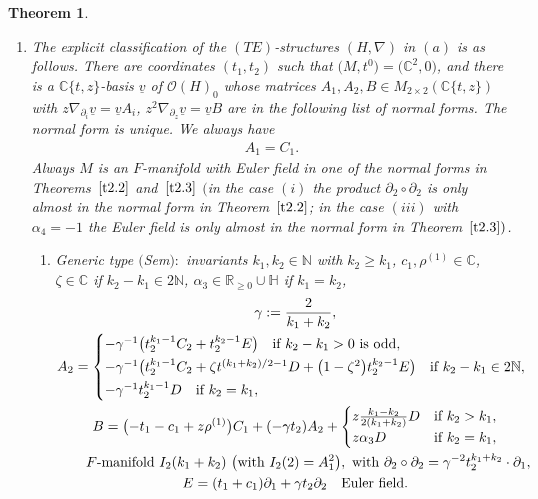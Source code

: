 \documentclass[10pt,a4paper]{amsart}
\numberwithin{equation}{section}
\numberwithin{figure}{section}
\newcommand{\N}{{\mathbb N}}
\newcommand{\C}{{\mathbb C}}
\newcommand{\R}{{\mathbb R}}
\renewcommand{\H}{{\mathbb H}}
\newcommand{\OO}{{\mathcal O}}
\newcommand{\uuuu}{\underline}
\newcommand{\paa}{\partial}
\newcommand{\nnn}{\nabla}
\newtheorem{Theorem}{Theorem}[section]
\begin{document}
\begin{Theorem}
\begin{enumerate}
\item[$(d)$] The explicit classification of the $(TE)$-structures
$(H,\nnn)$ in $(a)$ is as follows.
There are coordinates $(t_1,t_2)$ such that $\big(M,t^0\big)=\big(\C^2,0\big)$,
and there is a $\C\{t,z\}$-basis $\uuuu{v}$ of $\OO(H)_0$
whose matrices $A_1,A_2,B\in M_{2\times 2}(\C\{t,z\})$ with
$z\nnn_{\paa_i}\uuuu{v}=\uuuu{v}A_i$,
$z^2\nnn_{\paa_z}\uuuu{v}=\uuuu{v}B$ are in the following
list of normal forms. The normal form is unique.
We always have
\begin{gather*}%
A_1=C_1.
\end{gather*}
Always $M$ is an $F$-manifold with Euler field
in one of the normal forms in Theorems~$\ref{t2.2}$
and~$\ref{t2.3}$ $($in the case $(i)$ the product
$\paa_2\circ\paa_2$ is only almost in the normal form
in Theorem~$\ref{t2.2}$;
in the case $(iii)$ with $\alpha_4=-1$
the Euler field is only almost in the normal form
in Theorem~$\ref{t2.3})$.


\begin{enumerate}\itemsep=0pt
\item[$(i)$] Generic type $($Sem$){:}$
invariants $k_1,k_2\in\N$ with $k_2\geq k_1$,
$c_1,\rho^{(1)}\in\C$, $\zeta\in\C$ if $k_2-k_1\in 2\N$,
$\alpha_3\in\R_{\geq 0}\cup\H$ if $k_1=k_2$,
\begin{gather*}%
\gamma := \frac{2}{k_1+k_2},
\\
A_2=\begin{cases} -\gamma^{-1}
\big(t_2^{k_1-1}C_2 + t_2^{k_2-1}E\big)
\quad\text{if}\ k_2-k_1>0\ \text{is odd,}
\\[.5ex]
-\gamma^{-1}\big(t_2^{k_1-1}C_2 +\zeta t^{(k_1+k_2)/2-1}D+\big(1-\zeta^2\big)t_2^{k_2-1}E\big)
\quad \text{if}\ k_2-k_1\in 2\N,\!\!\!
\\[.5ex]
-\gamma^{-1}t_2^{k_1-1}D \quad\text{if}\ k_2=k_1,
\end{cases}
\\
B= \big({-}t_1-c_1+z\rho^{(1)}\big)C_1+(-\gamma t_2)A_2
+\begin{cases}
z\frac{k_1-k_2}{2(k_1+k_2)}D&\text{if}\ k_2>k_1,
\\
z\alpha_3 D&\text{if}\ k_2=k_1,\end{cases}
\\ \hphantom{B= }
\text{$F$-manifold }I_2(k_1+k_2)\ \big(\text{with }I_2(2)=A_1^2\big),\
\text{with}\ \paa_2\circ\paa_2
=\gamma^{-2}t_2^{k_1+k_2}\cdot \paa_1,
\\
E= (t_1+c_1)\paa_1 +\gamma t_2\paa_2\quad\text{Euler field}.
\end{gather*}


\end{enumerate}
\end{enumerate}
\end{Theorem}
\end{document}
